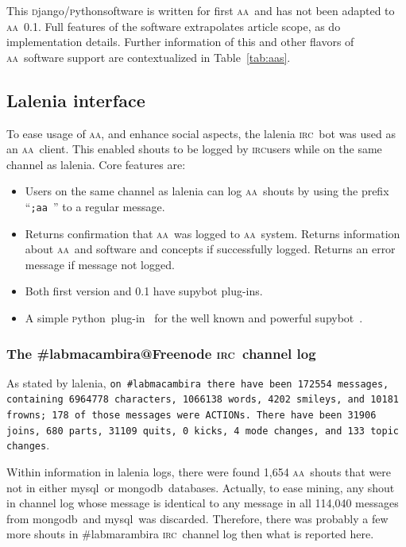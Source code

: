 \documentclass[a4paper, 11pt]{article} %
\newcommand{\python}{\textsc{p}ython}
\newcommand{\django}{\textsc{d}jango}
\newcommand{\irc}{\textsc{irc}}
\newcommand{\aab}{\textsc{aa}}
\newcommand{\mongodb}{{\sc m}ongo{\sc db}}
\newcommand{\mysql}{{\sc m}y{\sc sql}}
\begin{document}
This \django/\python software is written for first \aab\ and has not been adapted to \aab\ 0.1.
Full features of the software extrapolates article scope, as do implementation details. Further information of this and other flavors of \aab\ software support are contextualized in Table~\ref{tab:aas}.

\subsection{Lalenia interface}\label{sec:lalenia}
To ease usage of \aab, and enhance social aspects, the lalenia \irc\ bot was used as an \aab\ client. This enabled shouts to be logged by \irc users while on the same channel as lalenia. Core features are:
\begin{itemize}
    \item Users on the same channel as lalenia can log \aab\ shouts by using the prefix ``\texttt{;aa }'' to a regular message.
    \item Returns confirmation that \aab\ was logged to \aab\ system. Returns information about \aab\ and software and concepts if successfully logged. Returns an error message if message not logged.
    \item Both first version and 0.1 have supybot plug-ins.
    \item A simple \python\ plug-in~\cite{laleniaPlug} for the well known and powerful supybot~\cite{supybot}.
\end{itemize}


\subsubsection{The \#labmacambira@Freenode \irc\ channel log}\label{sec:cl}
As stated by lalenia, {\tt on \#labmacambira there have been 172554 messages, containing 6964778 characters, 1066138 words, 4202 smileys, and 10181 frowns; 178 of those messages were ACTIONs.  There have been 31906 joins, 680 parts, 31109 quits, 0 kicks, 4 mode changes, and 133 topic changes}.

Within information in lalenia logs, there were found 1,654 \aab\ shouts that were not in either \mysql\ or \mongodb\ databases. Actually, to ease mining, any shout in channel log whose message is identical to any message in all 114,040 messages from \mongodb\ and \mysql\ was discarded. Therefore, there was probably a few more shouts in \#labmarambira \irc\ channel log then what is reported here.
\end{document}
